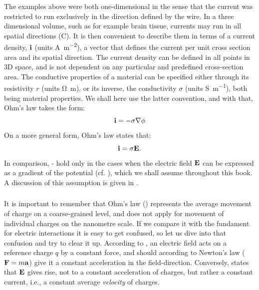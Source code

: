 The examples above were both one-dimensional in the sense that the current was restricted to run exclusively in the direction defined by the wire. In a three dimensional volume, such as for example brain tissue, currents may run in all spatial directions (C). It is then convenient to describe them in terms of a current density, ${\bf i}$ (units \si{\ampere\per\square\metre}), a vector that defines the current per unit cross section area and its spatial direction. The current density can be defined in all points in 3D space, and is not dependent on any particular and predefined cross-section area. The conductive properties of a material can be specified either through its resistivity $r$ (units \si{\ohm\metre}), or its inverse, the conductivity $\sigma$ (units \si{\siemens\per\metre}), both being material properties. We shall here use the latter convention, and with that, Ohm's law takes the form:
\begin{equation}
{\bf i} = - \sigma {\bf \nabla} \phi
\label{eq:Basics:Ohm_3D_phi}
\end{equation}
%
On a more general form, Ohm's law states that:
\begin{equation}
{\bf i} = \sigma {\bf E}.
\label{eq:Basics:Ohm_general}
\end{equation}
In comparison, - hold only in the cases when the electric field ${\bf E}$ can be expressed as a gradient of the potential (cf. ), which we shall assume throughout this book. A discussion of this assumption is given in .

\subsubsection{}
\label{sec:Basics:Note}
It is important to remember that Ohm's law () represents the average movement of charge on a coarse-grained level, and does not apply for movement of individual charges on the nanometre scale. If we compare it with the fundament for electric interactions it is easy to get confused, so let us dive into that confusion and try to clear it up. According to , an electric field acts on a reference charge $q$ by a constant force, and should according to Newton's law (${\bf F} = m{\bf a}$) give it a constant acceleration in the field-direction. Conversely,  states that ${\bf E}$ gives rise, not to a constant acceleration of charges, but rather a constant current, i.e., a constant average \textit{velocity} of charges.

